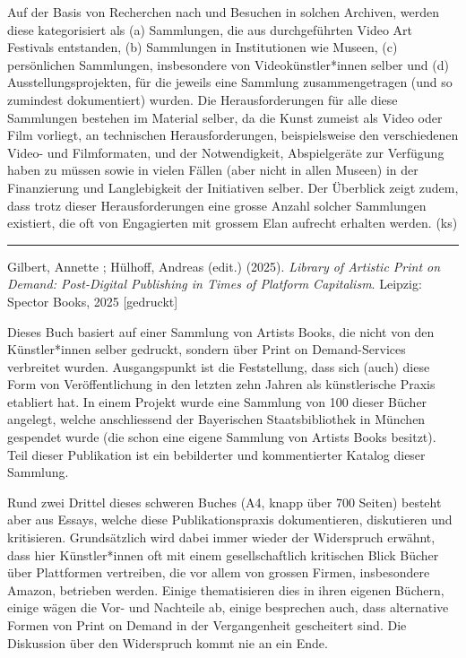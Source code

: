 \documentclass[a4paper,
fontsize=11pt,
oneside,
numbers=noperiodatend,
parskip=half-,
bibliography=totoc,
final
]{scrartcl}
\begin{document}
Auf der Basis von Recherchen nach und Besuchen in solchen Archiven,
werden diese kategorisiert als (a) Sammlungen, die aus durchgeführten
Video Art Festivals entstanden, (b) Sammlungen in Institutionen wie
Museen, (c) persönlichen Sammlungen, insbesondere von
Videokünstler*innen selber und (d) Ausstellungsprojekten, für die
jeweils eine Sammlung zusammengetragen (und so zumindest dokumentiert)
wurden. Die Herausforderungen für alle diese Sammlungen bestehen im
Material selber, da die Kunst zumeist als Video oder Film vorliegt, an
technischen Herausforderungen, beispielsweise den verschiedenen Video-
und Filmformaten, und der Notwendigkeit, Abspielgeräte zur Verfügung
haben zu müssen sowie in vielen Fällen (aber nicht in allen Museen) in
der Finanzierung und Langlebigkeit der Initiativen selber. Der Überblick
zeigt zudem, dass trotz dieser Herausforderungen eine grosse Anzahl
solcher Sammlungen existiert, die oft von Engagierten mit grossem Elan
aufrecht erhalten werden. (ks)

\begin{center}\rule{0.5\linewidth}{0.5pt}\end{center}

Gilbert, Annette ; Hülhoff, Andreas (edit.) (2025). \emph{Library of
Artistic Print on Demand: Post-Digital Publishing in Times of Platform
Capitalism}. Leipzig: Spector Books, 2025 {[}gedruckt{]}

Dieses Buch basiert auf einer Sammlung von Artists Books, die nicht von
den Künstler*innen selber gedruckt, sondern über Print on
Demand-Services verbreitet wurden. Ausgangspunkt ist die Feststellung,
dass sich (auch) diese Form von Veröffentlichung in den letzten zehn
Jahren als künstlerische Praxis etabliert hat. In einem Projekt wurde
eine Sammlung von 100 dieser Bücher angelegt, welche anschliessend der
Bayerischen Staatsbibliothek in München gespendet wurde (die schon eine
eigene Sammlung von Artists Books besitzt). Teil dieser Publikation ist
ein bebilderter und kommentierter Katalog dieser Sammlung.

Rund zwei Drittel dieses schweren Buches (A4, knapp über 700 Seiten)
besteht aber aus Essays, welche diese Publikationspraxis dokumentieren,
diskutieren und kritisieren. Grundsätzlich wird dabei immer wieder der
Widerspruch erwähnt, dass hier Künstler*innen oft mit einem
gesellschaftlich kritischen Blick Bücher über Plattformen vertreiben,
die vor allem von grossen Firmen, insbesondere Amazon, betrieben werden.
Einige thematisieren dies in ihren eigenen Büchern, einige wägen die
Vor- und Nachteile ab, einige besprechen auch, dass alternative Formen
von Print on Demand in der Vergangenheit gescheitert sind. Die
Diskussion über den Widerspruch kommt nie an ein Ende.
\end{document}
